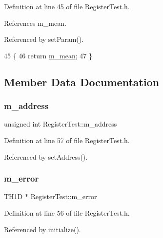 Definition at line 45 of file Register\+Test.\+h.



References m\+\_\+mean.



Referenced by set\+Param().


\begin{DoxyCode}
45                 \{
46     \textcolor{keywordflow}{return} \hyperlink{classRegisterTest_aba5ac8088017236617d2244fc0c261b9}{m\_mean};
47   \}
\end{DoxyCode}


\subsection{Member Data Documentation}
\mbox{\label{classRegisterTest_a1a227f5fe12e8cfc284a904bb9f7e109}} 
\subsubsection{\texorpdfstring{m\+\_\+address}{m\_address}}
{\footnotesize\ttfamily unsigned int Register\+Test\+::m\+\_\+address\hspace{0.3cm}{\ttfamily [private]}}



Definition at line 57 of file Register\+Test.\+h.



Referenced by set\+Address().

\mbox{\label{classRegisterTest_a9b32a49463a1b1d319fde007607254f0}} 
\subsubsection{\texorpdfstring{m\+\_\+error}{m\_error}}
{\footnotesize\ttfamily T\+H1D $\ast$ Register\+Test\+::m\+\_\+error\hspace{0.3cm}{\ttfamily [private]}}



Definition at line 56 of file Register\+Test.\+h.



Referenced by initialize().


